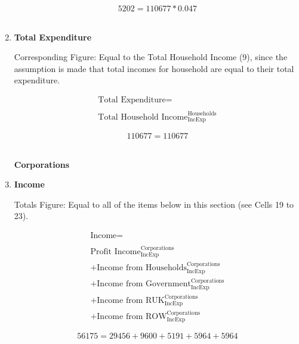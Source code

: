 \begin{enumerate}
\begin{equation} \nonumber
5202 = 110677*0.047
\end{equation}\\


\item \textbf {Total Expenditure}

Corresponding Figure: Equal to the Total Household Income (9), since the assumption is made that total incomes for household are equal to their total expenditure.

\begin{equation}
\begin{split}
\text{Total Expenditure} =  \\ \\
\text{Total Household Income}^\text{Households}_\text{IncExp}
\end{split} \label{eq:2.5.21}
\end{equation}

\begin{equation} \nonumber
110677 = 110677
\end{equation}\\



\pagebreak

\begin{center}
\textbf{\LARGE Corporations}
\end{center}

\item \textbf {Income}

Totals Figure: Equal to all of the items below in this section (see Cells 19 to 23).

\begin{equation}
\begin{split}
\text{Income} =  \\ \\
\text{Profit Income}^\text{Corporations}_\text{IncExp}\\
+\text{Income from Households}^\text{Corporations}_\text{IncExp}\\
+\text{Income from Government}^\text{Corporations}_\text{IncExp}\\
+\text{Income from RUK}^\text{Corporations}_\text{IncExp}\\
+\text{Income from ROW}^\text{Corporations}_\text{IncExp}
\end{split} \label{eq:2.5.22}
\end{equation}

\begin{equation} \nonumber
56175 = 29456+9600+5191+5964+5964
\end{equation}\\


\end{enumerate}
